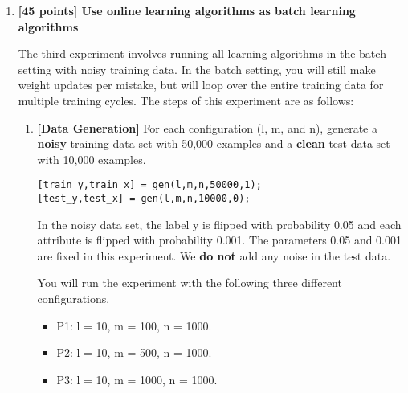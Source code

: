 \begin{enumerate}
For each algorithm, plot a curve of $W$ (the number of mistakes you
have made before the algorithm stops) as a function of $n$ on one
graph. Try this with convergence criterion $R = 1000$. It is possible
that it will take many examples to converge\footnote{If you are
running into memory problems, make sure you are not storing extraneous
information, like a cumulative count of errors for each example seen.}
; you can do it by cycling through the training data you
generated multiple times. If you are running into convergence problems
(e.g., no convergence after cycling through the data more than 10 times), try to
reduce $R$, but also think analytically about the choice of parameters
and initialization for the algorithms. Comment on the various
learning curves you see as part of your report.

\item {\bf [45 points] Use online learning algorithms as batch learning algorithms}

  The third experiment involves running all learning algorithms in the
  batch setting with noisy training data. In the batch setting, you will 
  still make weight updates per mistake, but will loop over the 
  entire training data for multiple training cycles. The steps of this experiment
  are as follows:

\begin{enumerate}
  \item {\bf [Data Generation]} For each configuration (l, m, and n),
  generate a {\bf noisy} training data set with 50,000 examples and a
  {\bf clean} test data set with 10,000 examples.
\begin{verbatim}
[train_y,train_x] = gen(l,m,n,50000,1);
[test_y,test_x] = gen(l,m,n,10000,0);
\end{verbatim}

In the noisy data set, the label y is flipped with probability 0.05
and each attribute is flipped with probability 0.001. The parameters
0.05 and 0.001 are fixed in this experiment. We {\bf do not} add any noise
in the test data.

You will run the experiment with the following three different configurations.
\begin{itemize}
\item P1: l = 10, m = 100, n = 1000.
\item P2: l = 10, m = 500, n = 1000.
\item P3: l = 10, m = 1000, n = 1000.
\end{itemize}


\end{enumerate}
\end{enumerate}

